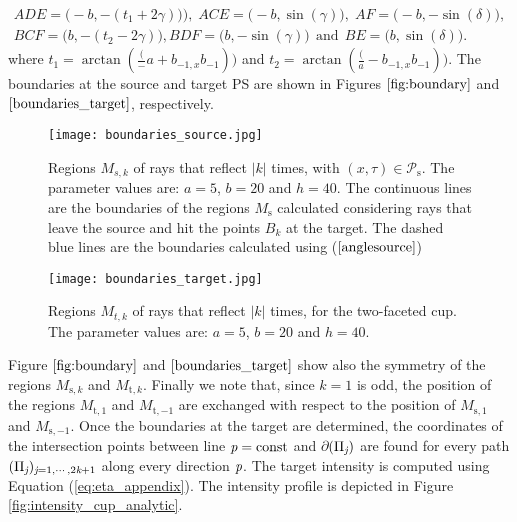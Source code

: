 $$ \begin{array}{cc}ADE = \big(-b, -(t_1+2\gamma)\big)),\; ACE = \big(-b, \sin(\gamma)\big),\; AF = \big(-b, -\sin(\delta)\big), \\
 BCF = \big(b, -(t_2-2\gamma)\big), BDF = \big(b, - \sin(\gamma)\big) \, \;\mbox{and} \,\; BE = \big(b, \sin(\delta)\big).\end{array} $$
 where $t_1 = \arctan(\frac(-a+b_{-1,x}{b_{-1}}))$ and $t_2 = \arctan(\frac(a-b_{-1,x}{b_{-1}}))$.
The boundaries at the source and target PS are shown in Figures $\ref{fig:boundary}$ and $\ref{boundaries_target}$, respectively. 
\begin{figure}[htbp]
\texttt{[image: boundaries\_source.jpg]}
\caption{\footnotesize{Regions $M_{s,k}$ of rays that reflect $|k|$ times, with $(x,\tau)\in\mathcal{P}_\textrm{s}$.
The parameter values are: $a=5$, $b=20$ and $h=40$. The continuous lines are the boundaries of the regions $M_{\textrm{s}}$
calculated considering rays that leave the source and hit the points $B_{k}$ at the target. The dashed blue lines are the boundaries calculated using ($\ref{anglesource}$) }}
\label{fig:boundary}
\end{figure}
\begin{figure}[htbp]
\texttt{[image: boundaries\_target.jpg]}
\caption{Regions $M_{t,k}$ of rays that reflect $|k|$ times, for the two-faceted cup. The parameter values are: $a=5$, $b=20$ and $h=40$.}
\label{boundaries_target}
\end{figure}
\noindent 
Figure $\ref{fig:boundary}$ and $\ref{boundaries_target}$ show also the symmetry of the regions $M_{\textrm{s},k}$ and $M_{\textrm{t},k}$. Finally we note that, since $k = 1$ is odd, the position of the regions $M_{\textrm{t},1}$ and $ M_{\textrm{t},-1}$ are exchanged with respect to the position of $ M_{\textrm{s},1}$ and $ M_{\textrm{s},-1}$.
Once the boundaries at the target are determined, the coordinates of the intersection points between line $\textit{p}=\textrm{const}$ and $\partial$$(\Pi_{\textit{j}})$ are found for every path $(\Pi_{\textit{j}})_{\textit{j}=1, \cdots, 2\textit{k}+1}$ along every direction $\textit{p}$. The target intensity is computed using Equation (\ref{eq:eta_appendix}). The intensity profile is depicted in Figure \ref{fig:intensity_cup_analytic}. 
